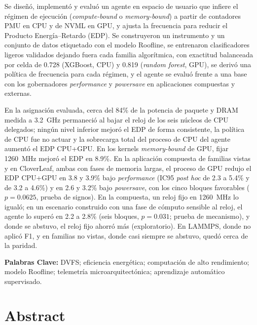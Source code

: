 Se diseñó, implementó y evaluó un agente en espacio de usuario que infiere el régimen de ejecución (\textit{compute-bound} o \textit{memory-bound}) a partir de contadores PMU en CPU y de NVML en GPU, y ajusta la frecuencia para reducir el Producto Energía--Retardo (EDP). Se construyeron un instrumento y un conjunto de datos etiquetado con el modelo Roofline, se entrenaron clasificadores ligeros validados dejando fuera cada familia algorítmica, con exactitud balanceada por celda de 0.728 (XGBoost, CPU) y 0.819 (\textit{random forest}, GPU), se derivó una política de frecuencia para cada régimen, y el agente se evaluó frente a una base con los gobernadores \textit{performance} y \textit{powersave} en aplicaciones compuestas y externas.

En la asignación evaluada, cerca del 84\% de la potencia de paquete y DRAM medida a 3.2~GHz permaneció al bajar el reloj de los seis núcleos de CPU delegados; ningún nivel inferior mejoró el EDP de forma consistente, la política de CPU fue no actuar y la sobrecarga total del proceso de CPU del agente aumentó el EDP CPU+GPU. En los kernels \textit{memory-bound} de GPU, fijar 1260~MHz mejoró el EDP en 8.9\%.
En la aplicación compuesta de familias vistas y en CloverLeaf, ambas con fases de memoria largas, el proceso de GPU redujo el EDP CPU+GPU en 3.8 y 3.9\% bajo \textit{performance} (IC95 \textit{post hoc} de 2.3 a 5.4\% y de 3.2 a 4.6\%) y en 2.6 y 3.2\% bajo \textit{powersave}, con los cinco bloques favorables ($p=0.0625$, prueba de signos). En la compuesta, un reloj fijo en 1260~MHz lo igualó; en un escenario construido con una fase de cómputo sensible al reloj, el agente lo superó en 2.2 a 2.8\% (seis bloques, $p=0.031$; prueba de mecanismo), y donde se abstuvo, el reloj fijo ahorró más (exploratorio). En LAMMPS, donde no aplicó F1, y en familias no vistas, donde casi siempre se abstuvo, quedó cerca de la paridad.

\enlargethispage{2\baselineskip}
\noindent\textbf{Palabras Clave:} DVFS; eficiencia energética; computación de alto rendimiento; modelo Roofline; telemetría microarquitectónica; aprendizaje automático supervisado.


\chapter*{Abstract}

